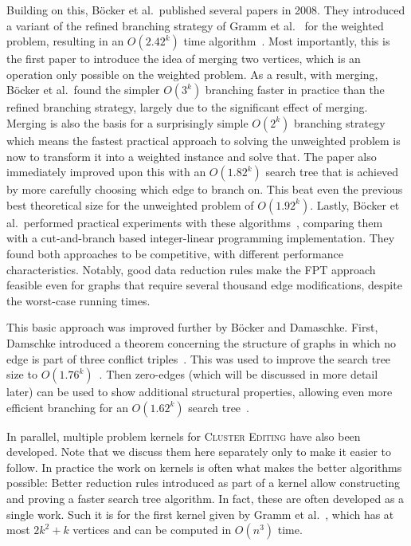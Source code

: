 \documentclass[12pt,oneside,english,parskip=full,headings=small]{scrbook}
\theoremstyle{definition}
\begin{document}
Building on this, Böcker et al.\ published several papers in 2008. They introduced a variant of the
refined branching strategy of Gramm et al.~\cite{Gramm} for the weighted problem, resulting in an
$O(2.42^k)$ time algorithm~\cite{AnApproach}. Most importantly, this is the first paper to introduce
the idea of merging two vertices, which is an operation only possible on the weighted problem. As a
result, with merging, Böcker et al.\ found the simpler $O(3^k)$ branching faster in practice than
the refined branching strategy, largely due to the significant effect of merging. Merging is also
the basis for a surprisingly simple $O(2^k)$ branching strategy~\cite{GoingWeighted} which means the
fastest practical approach to solving the unweighted problem is now to transform it into a weighted
instance and solve that. The paper also immediately improved upon this with an $O(1.82^k)$ search
tree that is achieved by more carefully choosing which edge to branch on. This beat even the
previous best theoretical size for the unweighted problem of $O(1.92^k)$. Lastly, Böcker et al.\
performed practical experiments with these algorithms~\cite{ExactAlgos}, comparing them with a
cut-and-branch based integer-linear programming implementation. They found both approaches to be
competitive, with different performance characteristics. Notably, good data reduction rules make the
FPT approach feasible even for graphs that require several thousand edge modifications, despite the
worst-case running times.

This basic approach was improved further by Böcker and Damaschke. First, Damschke introduced a
theorem concerning the structure of graphs in which no edge is part of three conflict
triples~\cite{BoundedDegree}. This was used to improve the search tree size to
$O(1.76^k)$~\cite{EvenFaster}. Then zero-edges (which will be discussed in more detail later) can be
used to show additional structural properties, allowing even more efficient branching for an
$O(1.62^k)$ search tree~\cite{GoldenRatio}.

In parallel, multiple problem kernels for \textsc{Cluster Editing} have also been developed. Note
that we discuss them here separately only to make it easier to follow. In practice the work on
kernels is often what makes the better algorithms possible: Better reduction rules introduced as
part of a kernel allow constructing and proving a faster search tree algorithm. In fact, these are
often developed as a single work. Such it is for the first kernel given by Gramm et al.~\cite{Gramm},
which has at most $2k^2 + k$ vertices and can be computed in $O(n^3)$ time.
\end{document}
